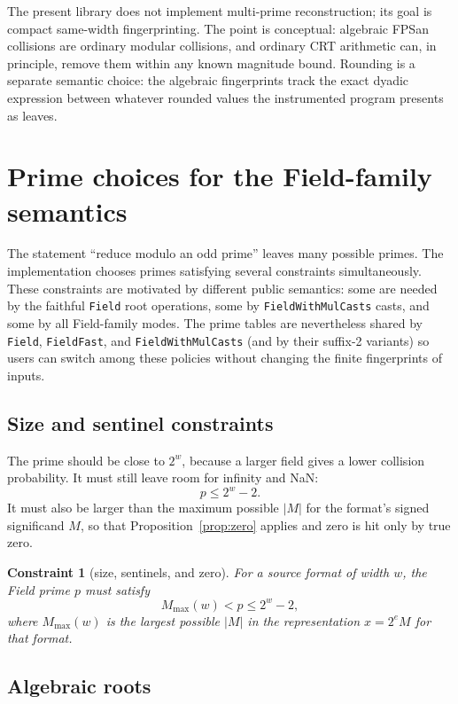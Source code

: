 \documentclass[11pt]{article}
\newcommand{\FieldFast}{\texttt{FieldFast}}
\newcommand{\FieldMC}{\texttt{FieldWith\allowbreak{}Mul\allowbreak{}Casts}}
\theoremstyle{plain}
\newtheorem{constraint}{Constraint}
\begin{document}
The present library does not implement multi-prime reconstruction; its goal is
compact same-width fingerprinting.  The point is conceptual: algebraic FPSan
collisions are ordinary modular collisions, and ordinary CRT arithmetic can, in
principle, remove them within any known magnitude bound.  Rounding is a separate
semantic choice: the algebraic fingerprints track the exact dyadic expression
between whatever rounded values the instrumented program presents as leaves.

\section{Prime choices for the Field-family semantics}

The statement ``reduce modulo an odd prime'' leaves many possible primes.  The
implementation chooses primes satisfying several constraints simultaneously.
These constraints are motivated by different public semantics: some are needed
by the faithful \texttt{Field} root operations, some by
\FieldMC{} casts, and some by all Field-family modes.  The prime tables are
nevertheless shared by \texttt{Field}, \FieldFast{}, and \FieldMC{} (and by their
suffix-2 variants) so users can switch among these policies without changing the
finite fingerprints of inputs.

\subsection{Size and sentinel constraints}

The prime should be close to \(2^w\), because a larger field gives a lower
collision probability.  It must still leave room for infinity and NaN:
\[
  p\le 2^w-2.
\]
It must also be larger than the maximum possible \(|M|\) for the format's signed
significand \(M\), so that Proposition~\ref{prop:zero} applies and zero is hit
only by true zero.

\begin{constraint}[size, sentinels, and zero]
\label{con:size}
For a source format of width \(w\), the Field prime \(p\) must satisfy
\[
  M_{\max}(w)<p\le 2^w-2,
\]
where \(M_{\max}(w)\) is the largest possible \(|M|\) in the representation
\(x=2^eM\) for that format.
\end{constraint}

\subsection{Algebraic roots}
\end{document}
